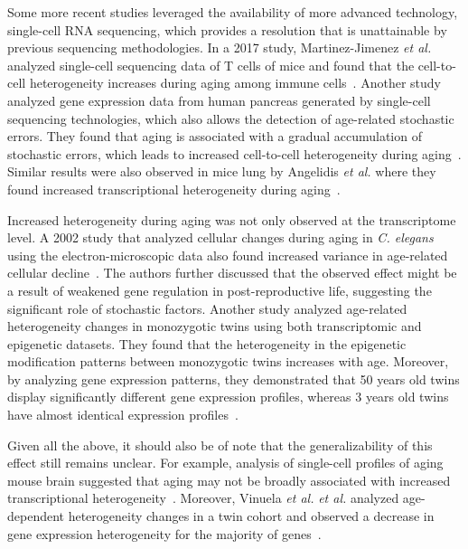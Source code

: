 Some more recent studies leveraged the availability of more advanced technology, single-cell RNA sequencing,
which provides a resolution that is unattainable by previous sequencing methodologies.
In a 2017 study, Martinez-Jimenez \textit{et al.} analyzed single-cell sequencing data of T cells of mice
and found that the cell-to-cell heterogeneity increases during aging among immune cells~\autocite{Martinez2017}.
Another study analyzed gene expression data from human pancreas generated by single-cell sequencing technologies,
which also allows the detection of age-related stochastic errors.
They found that aging is associated with a gradual accumulation of stochastic errors,
which leads to increased cell-to-cell heterogeneity during aging~\autocite{Enge2017}.
Similar results were also observed in mice lung by Angelidis \textit{et al.} 
where they found increased transcriptional heterogeneity during aging~\autocite{Angelidis2019}.

Increased heterogeneity during aging was not only observed at the transcriptome level.
A 2002 study that analyzed cellular changes during aging in \textit{C. elegans} using the electron-microscopic data also found increased variance in age-related cellular decline~\autocite{Herndon2002}.
The authors further discussed that the observed effect might be a result of weakened gene regulation in post-reproductive life, 
suggesting the significant role of stochastic factors.
Another study analyzed age-related heterogeneity changes in monozygotic twins using both transcriptomic and epigenetic datasets.
They found that the heterogeneity in the epigenetic modification patterns between monozygotic twins increases with age.
Moreover, by analyzing gene expression patterns, they demonstrated that 50 years old twins display significantly different gene expression profiles,
whereas 3 years old twins have almost identical expression profiles~\autocite{Fraga2005}.

Given all the above, it should also be of note that the generalizability of this effect still remains unclear.
For example, analysis of single-cell profiles of aging mouse brain suggested that 
aging may not be broadly associated with increased transcriptional heterogeneity~\autocite{Ximerakis2019}.
Moreover, Vinuela \textit{et al.} \textit{et al.} analyzed age-dependent heterogeneity changes in a twin cohort
and observed a decrease in gene expression heterogeneity for the majority of genes~\autocite{Vinuela2018}.

